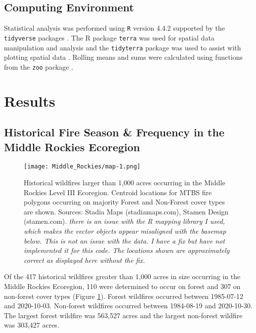 \documentclass[11pt]{article}
\begin{document}
\subsection{Computing Environment}

Statistical analysis was performed using \texttt{R} version 4.4.2 \citep{rcoreteamLanguageEnvironmentStatistical2024} supported by the \texttt{tidyverse} packages \citep{hernangomezUsingTidyverseTerra2023} .  The R package \texttt{terra} was used for spatial data manipulation and analysis \citep{hijmansTerraSpatialData2024} and the \texttt{tidyterra} package was used to assist with plotting spatial data \citep{hernangomezUsingTidyverseTerra2023}.  Rolling means and sums were calculated using functions from the \texttt{zoo} package \citep{zeileisZooS3Infrastructure2005}.  

\section{Results}

\subsection{Historical Fire Season \& Frequency in the Middle Rockies Ecoregion}

\begin{figure}[ht]
  \texttt{[image: Middle\_Rockies/map-1.png]}
  \caption{Historical wildfires larger than 1,000 acres occurring in the Middle Rockies Level III Ecoregion.  Centroid locations for MTBS fire polygons occurring on majority Forest and Non-Forest cover types are shown.  Sources: Stadia Maps (stadiamaps.com), Stamen Design (stamen.com). \textit{there is an issue with the R mapping library I used, which makes the vector objects appear misaligned with the basemap below.  This is not an issue with the data. I have a fix but have not implemented it for this code.  The locations shown are approximately correct as displayed here without the fix.}}
  \label{fig:map}
\end{figure}

Of the 417 historical wildfires greater than 1,000 acres in size occurring in the Middle Rockies Ecoregion, 110 were determined to occur on forest and 307 on non-forest cover types (Figure \ref{fig:map}).  Forest wildfires occurred between 1985-07-12 and 2020-10-03.  Non-forest wildfires occurred between 1984-08-19 and 2020-10-30.  The largest forest wildfire was 563,527 acres and the largest non-forest wildfire was 303,427 acres.
\end{document}
